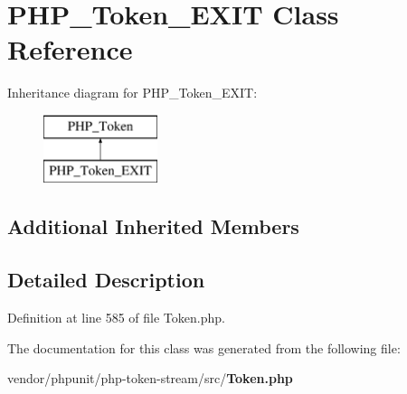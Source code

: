 \section{P\+H\+P\+\_\+\+Token\+\_\+\+E\+X\+I\+T Class Reference}
\label{class_p_h_p___token___e_x_i_t}
Inheritance diagram for P\+H\+P\+\_\+\+Token\+\_\+\+E\+X\+I\+T\+:\begin{figure}[H]
\begin{center}
\leavevmode
\includegraphics[height=2.000000cm]{class_p_h_p___token___e_x_i_t}
\end{center}
\end{figure}
\subsection*{Additional Inherited Members}


\subsection{Detailed Description}


Definition at line 585 of file Token.\+php.



The documentation for this class was generated from the following file\+:\begin{DoxyCompactItemize}
\item 
vendor/phpunit/php-\/token-\/stream/src/{\bf Token.\+php}\end{DoxyCompactItemize}
